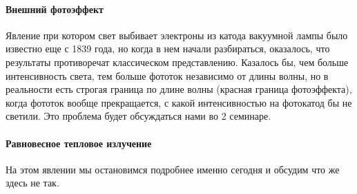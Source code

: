 \documentclass[12pt]{article}
\begin{document}
\paragraph{Внешний фотоэффект} 
Явление при котором свет выбивает электроны из катода вакуумной лампы было известно еще с 1839 года, но когда в нем начали разбираться, оказалось, что результаты противоречат классическом представлению. Казалось бы, чем больше интенсивность света, тем больше фототок независимо от длины волны, но в реальности есть строгая граница по длине волны (красная граница фотоэффекта), когда фототок вообще прекращается, с какой интенсивностью на фотокатод бы не светили. Это проблема будет обсуждаться нами во 2 семинаре. 
\paragraph{Равновесное тепловое излучение}
На этом явлении мы остановимся подробнее именно сегодня и обсудим что же здесь не так.
\end{document}
